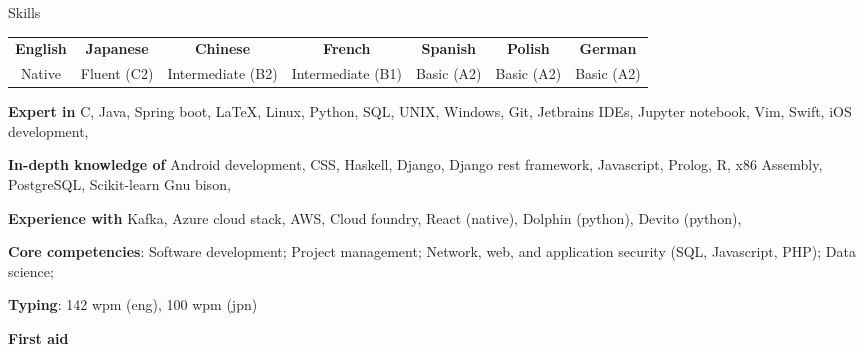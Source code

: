 \documentclass[10pt]{resume} %
\begin{document}
\begin{rSection}{Skills}

  \begin{center}
  \begin{tabular}{ c c c c c c c }
   \textbf{English} & \textbf{Japanese} & \textbf{Chinese} & \textbf{French} &
    \textbf{Spanish} & \textbf{Polish} & \textbf{German} \\
    Native & Fluent (C2) & Intermediate (B2) & Intermediate (B1) & Basic (A2) & Basic
    (A2) & Basic (A2)
  \end{tabular}
  \end{center}

  \item \textbf{Expert in}
    C,
    Java,
    Spring boot,
    \LaTeX,
    Linux,
    Python,
    SQL,
    UNIX,
    Windows,
    Git,
    Jetbrains IDEs,
    Jupyter notebook,
    Vim,
    Swift,
    iOS development,

  \item \textbf{In-depth knowledge of}
    Android development,
    CSS,
    Haskell,
    Django,
    Django rest framework,
    Javascript,
    Prolog,
    R,
    x86 Assembly,
    PostgreSQL,
    Scikit-learn
    Gnu bison,

  \item \textbf{Experience with}
    Kafka,
    Azure cloud stack,
    AWS,
    Cloud foundry,
    React (native),
    Dolphin (python),
    Devito (python),

  \item \textbf{Core competencies}:
    Software development;
    Project management;
    Network, web, and application security (SQL, Javascript, PHP);
    Data science;

  \item \textbf{Typing}: 142 wpm (eng), 100 wpm (jpn)

  \item \textbf{First aid}

\end{rSection}

\end{document}
